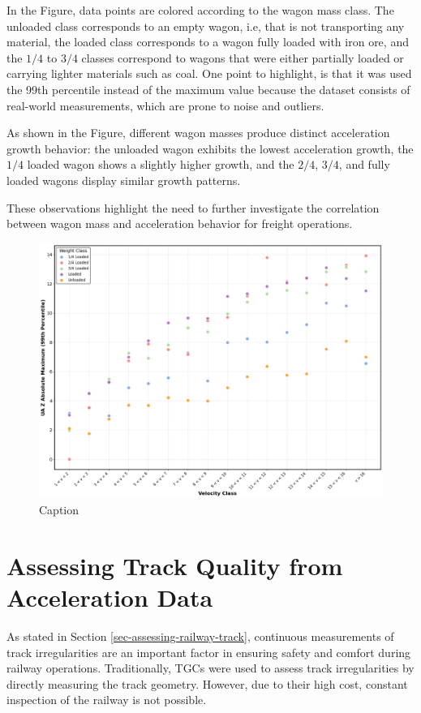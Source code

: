 In the Figure, data points are colored according to the wagon mass class. The unloaded class corresponds to an empty wagon, i.e, that is not transporting any material, the loaded class corresponds to a wagon fully loaded with iron ore, and the $1/4$ to $3/4$ classes correspond to wagons that were either partially loaded or carrying lighter materials such as coal. One point to highlight, is that it was used the 99th percentile instead of the maximum value because the dataset consists of real-world measurements, which are prone to noise and outliers.

As shown in the Figure, different wagon masses produce distinct acceleration growth behavior: the unloaded wagon exhibits the lowest acceleration growth, the $1/4$ loaded wagon shows a slightly higher growth, and the $2/4$, $3/4$, and fully loaded wagons display similar growth patterns.

These observations highlight the need to further investigate the correlation between wagon mass and acceleration behavior for freight operations.

\begin{figure}[H]
    \centering
    \includegraphics[width=12cm]{Cap2_LitReview/Mass_effect/Mass_effect.jpeg}
    \caption{Caption}
    \label{fig:mass_effect}
\end{figure}

\section{Assessing Track Quality from Acceleration Data} \label{sec-track-quality-accel}

As stated in Section \ref{sec-assessing-railway-track}, continuous measurements of track irregularities are an important factor in ensuring safety and comfort during railway operations. Traditionally, TGCs were used to assess track irregularities by directly measuring the track geometry. However, due to their high cost, constant inspection of the railway is not possible. 

